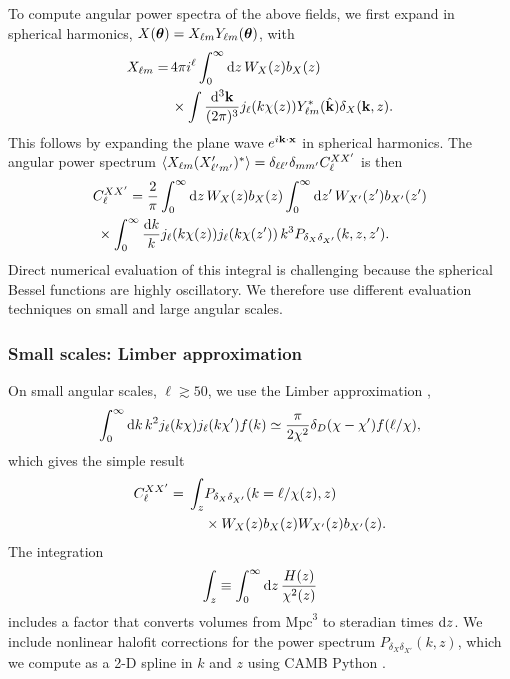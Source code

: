 \documentclass[prd,superscriptaddress,floatfix,notitlepage,nofootinbib,reprint]{revtex4-1} %
\begin{document}
To compute angular power spectra of the above fields, we first expand in spherical harmonics, $X(\boldsymbol\theta)=X_{\ell m}Y_{\ell m}(\boldsymbol\theta)$, with
\begin{align}
  \label{eq:35}
  X_{\ell m} =\,& 4\pi i^\ell \int_0^\infty \mathrm{d} z\,W_X(z)b_X(z)\nonumber\\
&\times\int\frac{\mathrm{d}^3{\mathbf{k}}}{(2\pi)^3}j_\ell(k\chi(z))Y^*_{\ell m}(\hat{{\mathbf{k}}})\delta_X({\mathbf{k}},z).
\end{align}
This follows by expanding the plane wave $e^{i{\mathbf{k}}\cdot{\mathbf{x}}}$ in spherical harmonics.
The angular power spectrum $\langle X_{\ell m}(X'_{\ell'm'})^*\rangle = \delta_{\ell\ell'}\delta_{mm'}C_\ell^{XX'}$ is then
\begin{align}
  \label{eq:FullLOSInt}
&  C_\ell^{XX'}  = 
\frac{2}{\pi}\int_0^\infty\mathrm{d} z\,W_{X}(z)b_X(z)
\int_0^\infty \mathrm{d} z'\,
W_{X'}(z')b_{X'}(z')\nonumber\\
&\;\times
\int_0^\infty\frac{\mathrm{d} k}{k} j_\ell(k\chi(z))j_\ell(k\chi(z'))\,k^3 P_{\delta_X\delta_{X'}}(k,z,z').
\end{align}
Direct numerical evaluation of this integral is challenging because the spherical Bessel functions are highly oscillatory. 
We therefore use different evaluation techniques on small and large angular scales.

\subsubsection{Small scales: Limber approximation}
On small angular scales, $\ell\gtrsim 50$, we use the Limber approximation \cite{1953ApJ...117..134L,1992ApJ...388..272K},
\begin{align}
  \label{eq:33}
  \int_0^\infty \mathrm{d} k\,k^2j_\ell(k\chi)j_\ell(k\chi') f(k) \simeq \frac{\pi}{2\chi^2}\delta_D(\chi-\chi')f(\ell/\chi),
\end{align}
which gives the simple result
\begin{align}
  \label{eq:CXY}
 C_\ell^{XX'}  = \,
\int_z &
P_{\delta_X\delta_{X'}}(k=\ell/\chi(z),z)\nonumber\\
&\times
W_{X}(z)b_X(z)
W_{X'}(z)b_{X'}(z).
\end{align}
The integration
\begin{align}
  \label{eq:RedshiftMeasure}
\int_z\equiv \int_0^\infty \mathrm{d} z\,\frac{H(z)}{\chi^2(z)}
\end{align}
includes a factor that converts volumes from $\mathrm{Mpc}^{3}$ to steradian times $\mathrm{d} z$.
We include nonlinear halofit corrections \cite{Takahashi:2012em,Mead:2015yca,Mead:2016zqy,Smith:2002dz} for the power spectrum $P_{\delta_X\delta_{X'}}(k,z)$, which we compute as a 2-D spline in $k$ and $z$ using CAMB Python \cite{camb,cambwebsite,cambpython}. 
\end{document}
